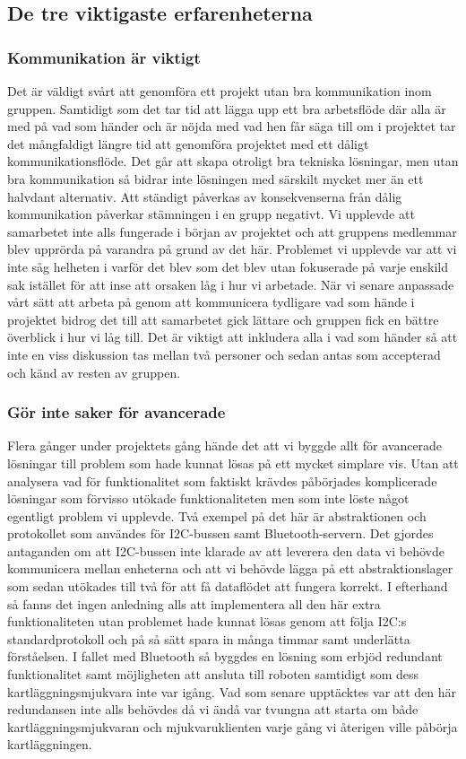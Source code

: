\documentclass{article}
\begin{document}
\subsection{De tre viktigaste erfarenheterna}
\subsubsection{Kommunikation är viktigt}
Det är väldigt svårt att genomföra ett projekt utan bra kommunikation inom gruppen. Samtidigt som det tar tid att lägga upp ett bra arbetsflöde där alla är med på vad som händer och är nöjda med vad hen får säga till om i projektet tar det mångfaldigt längre tid att genomföra projektet med ett dåligt kommunikationsflöde. Det går att skapa otroligt bra tekniska lösningar, men utan bra kommunikation så bidrar inte lösningen med särskilt mycket mer än ett halvdant alternativ.
\newline\newline
Att ständigt påverkas av konsekvenserna från dålig kommunikation påverkar stämningen i en grupp negativt. Vi upplevde att samarbetet inte alls fungerade i början av projektet och att gruppens medlemmar blev upprörda på varandra på grund av det här. Problemet vi upplevde var att vi inte såg helheten i varför det blev som det blev utan fokuserade på varje enskild sak istället för att inse att orsaken låg i hur vi arbetade. När vi senare anpassade vårt sätt att arbeta på genom att kommunicera tydligare vad som hände i projektet bidrog det till att samarbetet gick lättare och gruppen fick en bättre överblick i hur vi låg till. Det är viktigt att inkludera alla i vad som händer så att inte en viss diskussion tas mellan två personer och sedan antas som accepterad och känd av resten av gruppen.

\subsubsection{Gör inte saker för avancerade}
Flera gånger under projektets gång hände det att vi byggde allt för avancerade lösningar till problem som hade kunnat lösas på ett mycket simplare vis. Utan att analysera vad för funktionalitet som faktiskt krävdes påbörjades komplicerade lösningar som förvisso utökade funktionaliteten men som inte löste något egentligt problem vi upplevde. Två exempel på det här är abstraktionen och protokollet som användes för I2C-bussen samt Bluetooth-servern. Det gjordes antaganden om att I2C-bussen inte klarade av att leverera den data vi behövde kommunicera mellan enheterna och att vi behövde lägga på ett abstraktionslager som sedan utökades till två för att få dataflödet att fungera korrekt. I efterhand så fanns det ingen anledning alls att implementera all den här extra funktionaliteten utan problemet hade kunnat lösas genom att följa I2C:s standardprotokoll och på så sätt spara in många timmar samt underlätta förståelsen. I fallet med Bluetooth så byggdes en lösning som erbjöd redundant funktionalitet samt möjligheten att ansluta till roboten samtidigt som dess kartläggningsmjukvara inte var igång. Vad som senare upptäcktes var att den här redundansen inte alls behövdes då vi ändå var tvungna att starta om både kartläggningsmjukvaran och mjukvaruklienten varje gång vi återigen ville påbörja kartläggningen.
\end{document}
